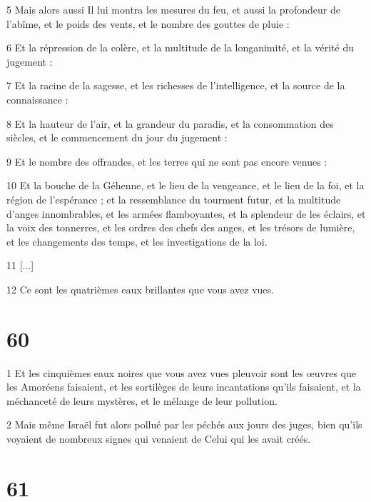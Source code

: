\par 5 Mais alors aussi Il lui montra les mesures du feu, et aussi la profondeur de l'abîme, et le poids des vents, et le nombre des gouttes de pluie :

\par 6 Et la répression de la colère, et la multitude de la longanimité, et la vérité du jugement :

\par 7 Et la racine de la sagesse, et les richesses de l'intelligence, et la source de la connaissance :

\par 8 Et la hauteur de l'air, et la grandeur du paradis, et la consommation des siècles, et le commencement du jour du jugement :

\par 9 Et le nombre des offrandes, et les terres qui ne sont pas encore venues :

\par 10 Et la bouche de la Géhenne, et le lieu de la vengeance, et le lieu de la foi, et la région de l'espérance ; et la ressemblance du tourment futur, et la multitude d'anges innombrables, et les armées flamboyantes, et la splendeur de les éclairs, et la voix des tonnerres, et les ordres des chefs des anges, et les trésors de lumière, et les changements des temps, et les investigations de la loi.

\par 11 [...]

\par 12 Ce sont les quatrièmes eaux brillantes que vous avez vues.

\chapter{60}

\par 1 Et les cinquièmes eaux noires que vous avez vues pleuvoir sont les œuvres que les Amoréens faisaient, et les sortilèges de leurs incantations qu'ils faisaient, et la méchanceté de leurs mystères, et le mélange de leur pollution.

\par 2 Mais même Israël fut alors pollué par les péchés aux jours des juges, bien qu'ils voyaient de nombreux signes qui venaient de Celui qui les avait créés.

\chapter{61}

